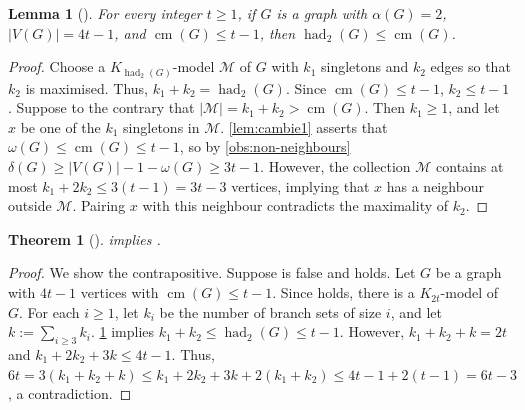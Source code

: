 \documentclass[11pt]{article}
\numberwithin{equation}{section}
\theoremstyle{plain}
\newtheorem{thm}[equation]{Theorem}
\newtheorem{lem}[equation]{Lemma}
\theoremstyle{definition}
\renewcommand{\geq}{\geqslant}
\renewcommand{\leq}{\leqslant}
\DeclareMathOperator{\had}{had}
\DeclareMathOperator{\cm}{cm}
\begin{document}
\begin{lem}[\citet{cambie2021hadwiger}]
    \label{lem:cambie2}
    For every integer $t \geq 1$, if $G$ is a graph with $\alpha(G) = 2$, $|V(G)| = 4t - 1$, and $\cm(G) \leq t - 1$, then $\had_2(G) \leq \cm(G)$.
\end{lem}
\begin{proof}
    Choose a $K_{\had_2(G)}$-model $\mathcal{M}$ of $G$ with $k_1$ singletons and $k_2$ edges so that $k_2$ is maximised. Thus, $k_1 + k_2 = \had_2(G)$.
    Since $\cm(G) \leq t-1$, $k_2 \leq t- 1$.
    Suppose to the contrary that $\left|\mathcal{M}\right| = k_1 + k_2 > \cm(G)$. Then $k_1 \geq 1$, and let $x$ be one of the $k_1$ singletons in $\mathcal{M}$.
    \cref{lem:cambie1} asserts that $\omega(G) \leq \cm(G) \leq t -1$, so by \cref{obs:non-neighbours} $ \delta(G) \geq |V(G)|-1 - \omega(G)\geq  3t-1$. However, the collection $\mathcal{M}$ contains at most $k_1+2k_2\leq 3(t-1) = 3t - 3$ vertices, implying that $x$ has a neighbour outside $\mathcal{M}$. Pairing $x$ with this neighbour contradicts the maximality of $k_2$.
\end{proof}
\begin{thm}[\citet{cambie2021hadwiger}]
    \label{thm:cambie}
     implies .
\end{thm}
\begin{proof}
    We show the contrapositive. Suppose  is false and  holds. Let $G$ be a graph with $4t - 1$ vertices with $\cm(G) \leq t- 1$. Since  holds, there is a $K_{2t}$-model of $G$. For each $i \geq 1$, let $k_i$ be the number of branch sets of size $i$, and let $k:= \sum_{i \geq 3} k_i$. \cref{lem:cambie2} implies $k_1 + k_2 \leq \had_2(G) \leq t-1$. However, $k_1 + k_2 + k = 2t$ and $k_1 + 2k_2 + 3k \leq 4t - 1$. Thus, $
        6t = 3(k_1+k_2+k) \leq k_1+2k_2+3k + 2(k_1+k_2) \leq 4t-1 +2(t-1)=6t-3$,
    a contradiction.
\end{proof}
\end{document}
